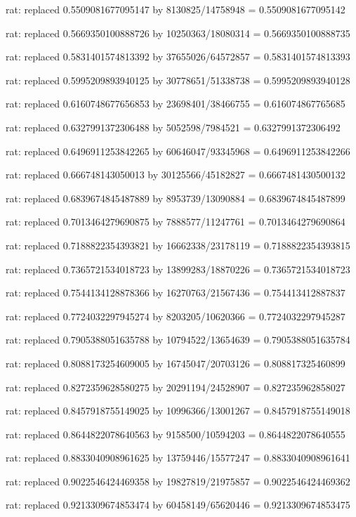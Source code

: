 \documentclass[a4paper,10pt]{article}
\begin{document}
\begin{eulernotebook}
\begin{eulercomment}
\begin{eulercomment}
\begin{eulercomment}
\begin{eulercomment}
\begin{eulercomment}
\begin{eulercomment}
\begin{eulercomment}
\begin{eulercomment}
\begin{eulercomment}
\begin{eulercomment}
\begin{eulercomment}
\begin{eulercomment}
\begin{eulercomment}
\begin{eulercomment}
\begin{eulercomment}
\begin{eulercomment}
\begin{euleroutput}
  rat: replaced 0.5509081677095147 by 8130825/14758948 = 0.5509081677095142
  
  rat: replaced 0.5669350100888726 by 10250363/18080314 = 0.5669350100888735
  
  rat: replaced 0.5831401574813392 by 37655026/64572857 = 0.5831401574813393
  
  rat: replaced 0.5995209893940125 by 30778651/51338738 = 0.5995209893940128
  
  rat: replaced 0.6160748677656853 by 23698401/38466755 = 0.616074867765685
  
  rat: replaced 0.6327991372306488 by 5052598/7984521 = 0.6327991372306492
  
  rat: replaced 0.6496911253842265 by 60646047/93345968 = 0.6496911253842266
  
  rat: replaced 0.666748143050013 by 30125566/45182827 = 0.6667481430500132
  
  rat: replaced 0.6839674845487889 by 8953739/13090884 = 0.6839674845487899
  
  rat: replaced 0.7013464279690875 by 7888577/11247761 = 0.7013464279690864
  
  rat: replaced 0.7188822354393821 by 16662338/23178119 = 0.7188822354393815
  
  rat: replaced 0.7365721534018723 by 13899283/18870226 = 0.7365721534018723
  
  rat: replaced 0.7544134128878366 by 16270763/21567436 = 0.754413412887837
  
  rat: replaced 0.7724032297945274 by 8203205/10620366 = 0.7724032297945287
  
  rat: replaced 0.7905388051635788 by 10794522/13654639 = 0.7905388051635784
  
  rat: replaced 0.8088173254609005 by 16745047/20703126 = 0.808817325460899
  
  rat: replaced 0.8272359628580275 by 20291194/24528907 = 0.827235962858027
  
  rat: replaced 0.8457918755149025 by 10996366/13001267 = 0.8457918755149018
  
  rat: replaced 0.8644822078640563 by 9158500/10594203 = 0.8644822078640555
  
  rat: replaced 0.8833040908961625 by 13759446/15577247 = 0.8833040908961641
  
  rat: replaced 0.9022546424469358 by 19827819/21975857 = 0.9022546424469362
  
  rat: replaced 0.9213309674853474 by 60458149/65620446 = 0.9213309674853475
  

\end{euleroutput}
\end{eulercomment}
\end{eulercomment}
\end{eulercomment}
\end{eulercomment}
\end{eulercomment}
\end{eulercomment}
\end{eulercomment}
\end{eulercomment}
\end{eulercomment}
\end{eulercomment}
\end{eulercomment}
\end{eulercomment}
\end{eulercomment}
\end{eulercomment}
\end{eulercomment}
\end{eulercomment}
\end{eulernotebook}
\end{document}
